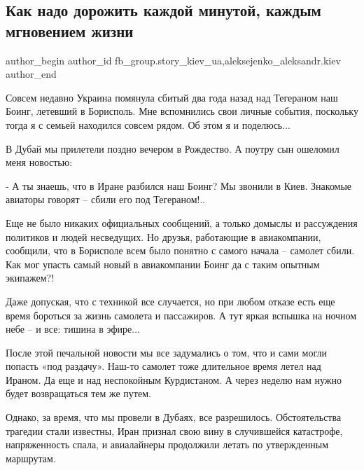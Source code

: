  
 
 
 
 
 
\subsection{Как надо дорожить каждой минутой, каждым мгновением жизни}
\label{sec:10_01_2022.fb.fb_group.story_kiev_ua.1.tegeran}
 
\ifcmt
 author_begin
   author_id fb_group.story_kiev_ua,aleksejenko_aleksandr.kiev
 author_end
\fi

Совсем недавно Украина помянула сбитый два года назад над Тегераном наш Боинг,
летевший в Борисполь. Мне вспомнились свои личные события, поскольку тогда я с
семьей находился совсем рядом. Об этом я и поделюсь...

В Дубай мы прилетели поздно вечером в Рождество. А поутру сын ошеломил меня
новостью:

- А ты знаешь, что в Иране разбился наш Боинг? Мы звонили в Киев.  Знакомые
авиаторы говорят – сбили его под Тегераном!..

Еще не было никаких официальных сообщений, а только домыслы и рассуждения
политиков и людей несведущих. Но друзья, работающие в авиакомпании,
сообщили, что в Борисполе всем было понятно с самого начала –  самолет
сбили. Как мог упасть самый новый в авиакомпании Боинг да с таким опытным
экипажем?!

Даже допуская, что с техникой все случается, но при любом отказе есть еще
время бороться за жизнь самолета и пассажиров. А тут яркая вспышка на
ночном небе – и все: тишина в эфире...

После этой печальной новости мы все задумались о том, что и сами могли
попасть «под раздачу». Наш-то самолет  тоже длительное время летел над
Ираном. Да еще и над неспокойным Курдистаном. А через неделю нам нужно
будет возвращаться тем же путем.

Однако, за время, что мы провели в Дубаях, все разрешилось.
Обстоятельства трагедии стали известны, Иран признал свою вину в
случившейся катастрофе, напряженность спала, и авиалайнеры продолжили
летать по утвержденным маршрутам.

